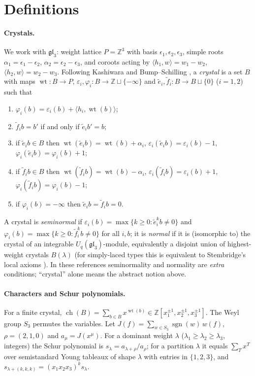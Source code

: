 \documentclass[11pt]{article}
\theoremstyle{definition}
\theoremstyle{remark}
\newcommand{\wt}{\operatorname{wt}}
\newcommand{\ch}{\operatorname{ch}}
\newcommand{\sgn}{\operatorname{sgn}}
\newcommand{\Z}{\mathbb Z}
\begin{document}
\section{Definitions}

\paragraph{Crystals.} We work with $\mathfrak{gl}_3$: weight lattice $P=\Z^3$ with basis
$\epsilon_1,\epsilon_2,\epsilon_3$, simple roots $\alpha_1=\epsilon_1-\epsilon_2$,
$\alpha_2=\epsilon_2-\epsilon_3$, and coroots acting by $\langle h_1,w\rangle=w_1-w_2$,
$\langle h_2,w\rangle=w_2-w_3$. Following Kashiwara
\cite{Kas93,Kas95} and Bump--Schilling \cite[Ch.~2]{BS17}, a \emph{crystal} is a set $B$ with
maps $\wt\colon B\to P$, $\varepsilon_i,\varphi_i\colon B\to\Z\sqcup\{-\infty\}$ and
$\tilde e_i,\tilde f_i\colon B\to B\sqcup\{0\}$ ($i=1,2$) such that
\begin{enumerate}
\item $\varphi_i(b)=\varepsilon_i(b)+\langle h_i,\wt(b)\rangle$;
\item $\tilde f_i b=b'$ if and only if $\tilde e_i b'=b$;
\item if $\tilde e_ib\in B$ then $\wt(\tilde e_ib)=\wt(b)+\alpha_i$,
$\varepsilon_i(\tilde e_ib)=\varepsilon_i(b)-1$, $\varphi_i(\tilde e_ib)=\varphi_i(b)+1$;
\item if $\tilde f_ib\in B$ then $\wt(\tilde f_ib)=\wt(b)-\alpha_i$,
$\varepsilon_i(\tilde f_ib)=\varepsilon_i(b)+1$, $\varphi_i(\tilde f_ib)=\varphi_i(b)-1$;
\item if $\varphi_i(b)=-\infty$ then $\tilde e_ib=\tilde f_ib=0$.
\end{enumerate}
A crystal is \emph{seminormal} if
$\varepsilon_i(b)=\max\{k\ge 0:\tilde e_i^k b\ne 0\}$ and
$\varphi_i(b)=\max\{k\ge0:\tilde f_i^kb\ne0\}$ for all $i,b$; it is \emph{normal} if it is
(isomorphic to) the crystal of an integrable $U_q(\mathfrak{gl}_3)$-module, equivalently a
disjoint union of highest-weight crystals $B(\lambda)$ (for simply-laced types this is
equivalent to Stembridge's local axioms \cite{Ste03}). In these references seminormality and
normality are \emph{extra} conditions; ``crystal'' alone means the abstract notion above.

\paragraph{Characters and Schur polynomials.} For a finite crystal,
$\ch(B)=\sum_{b\in B}x^{\wt(b)}\in\Z[x_1^{\pm1},x_2^{\pm1},x_3^{\pm1}]$. The Weyl group $S_3$
permutes the variables. Let $J(f)=\sum_{w\in S_3}\sgn(w)\,w(f)$, $\rho=(2,1,0)$ and
$a_\mu=J(x^\mu)$. For a dominant weight $\lambda$ ($\lambda_1\ge\lambda_2\ge\lambda_3$, integers)
the Schur polynomial is $s_\lambda=a_{\lambda+\rho}/a_\rho$; for a partition $\lambda$ it equals
$\sum_T x^T$ over semistandard Young tableaux of shape $\lambda$ with entries in $\{1,2,3\}$,
and $s_{\lambda+(k,k,k)}=(x_1x_2x_3)^ks_\lambda$.
\end{document}
